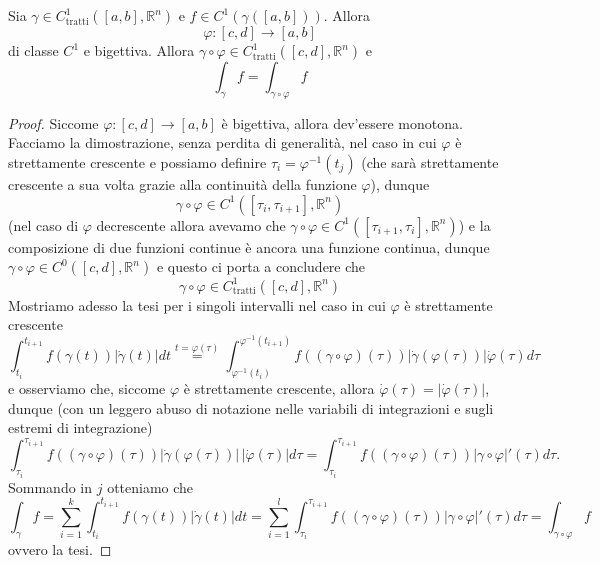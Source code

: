 


\begin{theorem}
	Sia $\gamma \in C^1_{\text{tratti}}([a, b], \mathbb{R}^n)$ e $f \in C^1(\gamma([a, b]))$. Allora 
	$$
		\varphi: [c, d] \to [a, b]
	$$
	di classe $C^1$ e bigettiva. Allora $\gamma \circ \varphi \in C^1_{\text{tratti}}([c,d], \mathbb{R}^n)$ e
	$$
		\int_{\gamma} f = \int_{\gamma \circ \varphi} f
	$$
\end{theorem}
\begin{proof}
Siccome $\varphi: [c,d] \to [a,b]$ è bigettiva, allora dev'essere monotona. Facciamo la dimostrazione, senza perdita di generalità, nel caso in cui $\varphi$ è strettamente crescente
e possiamo definire $\tau_i = \varphi^{-1}(t_j)$ (che sarà strettamente crescente a sua volta grazie alla continuità della funzione $\varphi$), dunque
$$
\gamma \circ \varphi \in C^1([\tau_i, \tau_{i+1}], \mathbb{R}^n)
$$
(nel caso di $\varphi$ decrescente allora avevamo che $\gamma \circ \varphi \in C^1([\tau_{i+1}, \tau_{i}], \mathbb{R}^n)$) e la composizione di due funzioni continue è ancora una funzione continua, dunque
$\gamma \circ \varphi \in C^{0}([c, d], \mathbb{R}^n)$ e questo ci porta a concludere che
$$
\gamma \circ \varphi \in C^1_{\text{tratti}}([c, d], \mathbb{R}^n)
$$
Mostriamo adesso la tesi per i singoli intervalli nel caso in cui $\varphi$ è strettamente crescente
$$
\int_{t_i}^{t_{i+1}} f(\gamma(t))|\dot{\gamma}(t)|dt \stackrel{t = \varphi(\tau)}{=} \int_{\varphi^{-1}(t_{i})}^{\varphi^{-1}(t_{i+1})} f((\gamma \circ \varphi)(\tau))|\dot{\gamma}(\varphi(\tau))|\dot{\varphi}(\tau) d\tau
$$
\noindent e osserviamo che, siccome $\varphi$ è strettamente crescente, allora $\dot{\varphi}(\tau) = |\dot{\varphi}(\tau)|$, dunque (con un leggero abuso di notazione nelle variabili di integrazioni e sugli estremi di integrazione)
$$
\int_{\tau_i}^{\tau_{i+1}} f((\gamma \circ \varphi)(\tau))|\dot{\gamma}(\varphi(\tau))| \, |\dot{\varphi}(\tau)| d\tau = \int_{\tau_i}^{\tau_{i+1}} f( (\gamma \circ \varphi)(\tau) ) |\gamma \circ \varphi|'(\tau) d\tau.
$$
Sommando in $j$ otteniamo che
$$
\int_\gamma f = \sum_{i=1}^k \int_{t_i}^{t_{i+1}} f(\gamma(t))|\dot{\gamma}(t)|dt = \sum_{i=1}^l \int_{\tau_i}^{\tau_{i+1}} f((\gamma \circ \varphi)(\tau)) |\gamma \circ \varphi|'(\tau) d\tau = \int_{\gamma \circ \varphi} f 
$$
ovvero la tesi.
\end{proof}

